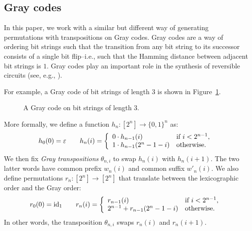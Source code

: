 \documentclass[a4paper]{article}
\theoremstyle{plain}
\theoremstyle{definition}
\newcommand{\iid}{\mathrm{id}}
\begin{document}
\subsection{Gray codes}
\label{sec:gray}

In this paper, we work with a similar but different way of generating
permutations with transpositions on Gray codes. Gray codes are a way of
ordering bit strings such that the transition from any bit string to its
successor consists of a single bit flip--i.e., such that the Hamming
distance between adjacent bit strings is $1$. Gray codes play an important
role in the synthesis of reversible circuits (see, e.g.,
\cite{nielsenchuang}).

For example, a Gray code of bit strings of length $3$ is shown in
Figure~\ref{fig:gray}.
\begin{figure}
	\caption{A Gray code on bit strings of length $3$.}
	\label{fig:gray}
\end{figure}


More formally, we define a function $h_n \colon [2^n] \to
\{0,1\}^n$ as:
\[
h_0(0) = \varepsilon
\qquad
h_n(i) =
\left\{
\begin{array}{ll}
 0 \cdot h_{n-1}(i) & \text{if } i < 2^{n-1}\text, \\
 1 \cdot h_{n-1}(2^n-1-i) & \text{otherwise.}
\end{array}
\right.
\]
We then fix \emph{Gray transpositions} $\theta_{n,i}$ to swap
$h_n(i)$ with $h_n(i+1)$. The two latter words have common prefix $w_n(i)$
and common suffix $w'_n(i)$.
We also define permutations $r_n \colon [2^n] \to [2^n]$ that translate
between the lexicographic order and the Gray order:
\[
r_0(0) = \iid_1
\qquad
r_n(i) =
\left\{
\begin{array}{ll}
 r_{n-1}(i) & \text{if } i < 2^{n-1}\text, \\
 2^{n-1} + r_{n-1}(2^n-1-i) & \text{otherwise.}
\end{array}
\right.
\]
In other words, the transposition $\theta_{n,i}$ swaps $r_n(i)$ and $r_n(i+1)$.
\end{document}
